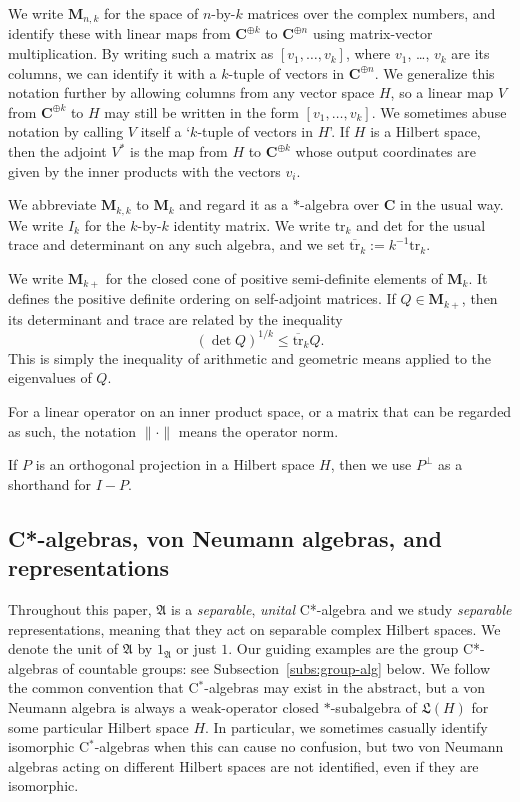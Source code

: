 \documentclass[12pt,a4paper]{article}
\numberwithin{equation}{section}
\theoremstyle{remark}
\newcommand{\bbC}{\mathbf{C}}
\newcommand{\rmM}{\mathbf{M}}
\newcommand{\A}{\mathfrak{A}}
\newcommand{\frL}{\mathfrak{L}}
\newcommand{\tr}{\overline{\mathrm{tr}}}
\newcommand{\Tr}{\mathrm{tr}}
\newcommand{\Det}{\mathrm{det}}
\begin{document}
We write $\rmM_{n,k}$ for the space of $n$-by-$k$ matrices over the complex numbers, and identify these with linear maps from $\bbC^{\oplus k}$ to $\bbC^{\oplus n}$ using matrix-vector multiplication.  By writing such a matrix as $[v_1,\dots,v_k]$, where $v_1$, \dots, $v_k$ are its columns, we can identify it with a $k$-tuple of vectors in $\bbC^{\oplus n}$.  We generalize this notation further by allowing columns from any vector space $H$, so a linear map $V$ from $\bbC^{\oplus k}$ to $H$ may still be written in the form $[v_1,\dots,v_k]$.  We sometimes abuse notation by calling $V$ itself a `$k$-tuple of vectors in $H$'.  If $H$ is a Hilbert space, then the adjoint $V^\ast$ is the map from $H$ to $\bbC^{\oplus k}$ whose output coordinates are given by the inner products with the vectors $v_i$.

We abbreviate $\rmM_{k,k}$ to $\rmM_k$ and regard it as a $\ast$-algebra over $\bbC$ in the usual way.  We write $I_k$ for the $k$-by-$k$ identity matrix. We write $\Tr_k$ and $\Det$ for the usual trace and determinant on any such algebra, and we set $\tr_k := k^{-1}\Tr_k$.

We write $\rmM_{k+}$ for the closed cone of positive semi-definite elements of $\rmM_k$.  It defines the positive definite ordering on self-adjoint matrices. If $Q \in \rmM_{k+}$, then its determinant and trace are related by the inequality
\begin{equation}\label{eq:AMGM}
(\det Q)^{1/k}\le \tr_k Q.
\end{equation}
This is simply the inequality of arithmetic and geometric means applied to the eigenvalues of $Q$.

For a linear operator on an inner product space, or a matrix that can be regarded as such, the notation $\|\cdot\|$ means the operator norm.

If $P$ is an orthogonal projection in a Hilbert space $H$, then we use $P^\perp$ as a shorthand for $I-P$.










\subsection{C*-algebras, von Neumann algebras, and representations}\label{subs:basics}

Throughout this paper, $\A$ is a \emph{separable}, \emph{unital} C*-algebra and we study \emph{separable} representations, meaning that they act on separable complex Hilbert spaces.  We denote the unit of $\A$ by $1_\A$ or just $1$.  Our guiding examples are the group C*-algebras of countable groups: see Subsection~\ref{subs:group-alg} below.  We follow the common convention that C$^\ast$-algebras may exist in the abstract, but a von Neumann algebra is always a weak-operator closed $\ast$-subalgebra of $\frL(H)$ for some particular Hilbert space $H$.  In particular, we sometimes casually identify isomorphic C$^\ast$-algebras when this can cause no confusion, but two von Neumann algebras acting on different Hilbert spaces are not identified, even if they are isomorphic.
\end{document}
